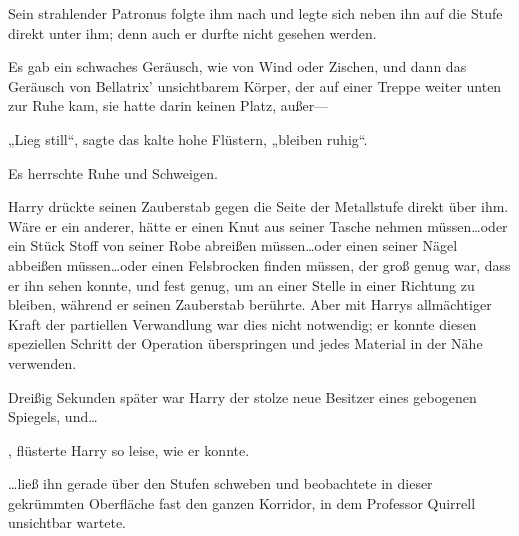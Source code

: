 Sein strahlender Patronus folgte ihm nach und legte sich neben ihn auf die Stufe direkt unter ihm; denn auch er durfte nicht gesehen werden.

Es gab ein schwaches Geräusch, wie von Wind oder Zischen, und dann das Geräusch von Bellatrix’ unsichtbarem Körper, der auf einer Treppe weiter unten zur Ruhe kam, sie hatte darin keinen Platz, außer—

„Lieg still“, sagte das kalte hohe Flüstern, „bleiben ruhig“.

Es herrschte Ruhe und Schweigen.

Harry drückte seinen Zauberstab gegen die Seite der Metallstufe direkt über ihm. Wäre er ein anderer, hätte er einen Knut aus seiner Tasche nehmen müssen…oder ein Stück Stoff von seiner Robe abreißen müssen…oder einen seiner Nägel abbeißen müssen…oder einen Felsbrocken finden müssen, der groß genug war, dass er ihn sehen konnte, und fest genug, um an einer Stelle in einer Richtung zu bleiben, während er seinen Zauberstab berührte. Aber mit Harrys allmächtiger Kraft der partiellen Verwandlung war dies nicht notwendig; er konnte diesen speziellen Schritt der Operation überspringen und jedes Material in der Nähe verwenden.

Dreißig Sekunden später war Harry der stolze neue Besitzer eines gebogenen Spiegels, und…

, flüsterte Harry so leise, wie er konnte.

…ließ ihn gerade über den Stufen schweben und beobachtete in dieser gekrümmten Oberfläche fast den ganzen Korridor, in dem Professor Quirrell unsichtbar wartete.

